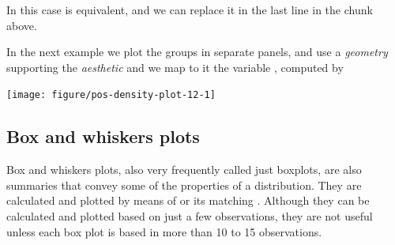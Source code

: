 \documentclass[krantz2]{krantz}\usepackage{knitr}%
\begin{document}
In this case  is equivalent, and we can replace it in the last line in the chunk above.

\begin{knitrout}\footnotesize
{}\color{fgcolor}\begin{kframe}
\begin{alltt}
  \hlstd{()}
\end{alltt}
\end{kframe}
\end{knitrout}

In the next example we plot the groups in separate panels, and use a \emph{geometry} supporting the  \emph{aesthetic} and we map to it the variable , computed by 



\begin{knitrout}\footnotesize
{}\color{fgcolor}\begin{kframe}
\begin{alltt}
  \hlopt{+}
\hlstd{(}\hlstd{(}   \hlstd{=} \hlstd{)} \hlopt{+}
  \hlstd{(}\hlopt{~}
\end{alltt}
\end{kframe}

{\centering \texttt{[image: figure/pos-density-plot-12-1]} 

}



\end{knitrout}



\subsection{Box and whiskers plots}\label{sec:boxplot}

Box and whiskers plots, also very frequently called just boxplots, are also summaries that convey some of the properties of a distribution. They are calculated and plotted by means of  or its matching . Although they can be calculated and plotted based on just a few observations, they are not useful unless each box plot is based in more than 10 to 15 observations.
\end{document}
